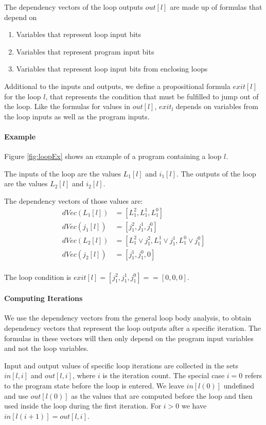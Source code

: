The dependency vectors of the loop outputs $out[l]$ are made up of formulas that depend on
\begin{enumerate}
    \setlength\itemsep{0em}
    \item Variables that represent loop input bits
    \item Variables that represent program input bits
    \item Variables that represent loop input bits from enclosing loops
\end{enumerate}

Additional to the inputs and outputs, we define a propositional formula $exit[l]$ for the loop $l$, that represents the condition that must be fulfilled to jump out of the loop. Like the formulas for values in $out[l]$, $exit_l$ depends on variables from the loop inputs as well as the program inputs. 

\paragraph{Example}
Figure \ref{fig:loopEx} shows an example of a program containing a loop $l$.

The inputs of the loop are the values $L_1[l]$ and $i_1[l]$. The outputs of the loop are the values $L_2[l]$ and $i_2[l]$.

The dependency vectors of those values are:
\begin{align*}
    dVec(L_1[l]) &= [L_1^2, L_1^1, L_1^0] \\
    dVec(j_1[l]) &= [j_1^2, j_1^1, j_1^0] \\
    dVec(L_2[l]) &= [L_1^2 \lor j_1^2, L_1^1 \lor j_1^1, L_1^0 \lor j_1^0] \\
    dVec(j_2[l]) &= [j_1^1, j_1^0, 0] \\
\end{align*}

The loop condition is $exit[l] = [j_1^2, j_1^1, j_1^0] == [0, 0, 0]$.

\paragraph{Computing Iterations}
We use the dependency vectors from the general loop body analysis, to obtain dependency vectors that represent the loop outputs after a specific iteration. The formulas in these vectors will then only depend on the program input variables and not the loop variables.

Input and output values of specific loop iterations are collected in the sets $in[l, i]$ and $out[l, i]$, where $i$ is the iteration count. The special case $i = 0$ refers to the program state before the loop is entered. We leave $in[l(0)]$ undefined and use $out[l(0)]$ as the values that are computed before the loop and then used inside the loop during the first iteration. For $i > 0$ we have $in[l(i + 1)] = out[l, i]$.


